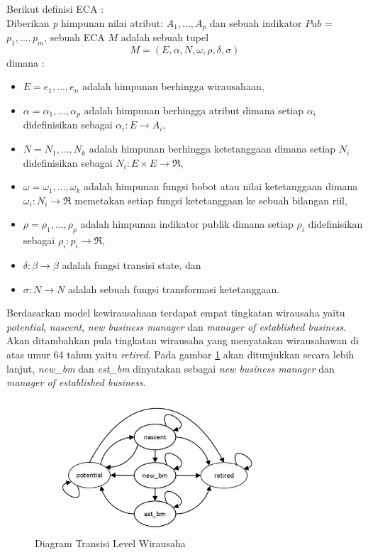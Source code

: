 Berikut definisi ECA :\\
Diberikan \textit{p} himpunan nilai atribut: $A_{1}, ..., A_{p}$ dan sebuah indikator $Pub$ = ${p_{1}, ..., p_{m}}$, sebuah ECA $M$ adalah sebuah tupel
\begin{displaymath}
	M = (E, \alpha, N, \omega, \rho, \delta, \sigma)
\end{displaymath}
dimana :
\begin{itemize}
	\item $E = {e_{1}, ..., e_{n}}$ adalah himpunan berhingga wirausahaan,
	\item $\alpha = {\alpha_{1}, ..., \alpha_{p}}$ adalah himpunan berhingga atribut dimana setiap $\alpha_{i}$ didefinisikan sebagai $\alpha_{i} : E \rightarrow A_{i}$,
	\item $N = {N_{1}, ..., N_{k}}$ adalah himpunan berhingga ketetanggaan dimana setiap $N_{i}$ didefinisikan sebagai $N_{i}:E \times E \rightarrow \Re$,
	\item $\omega = {\omega_{1}, ..., \omega_{k}}$ adalah himpunan fungsi bobot atau nilai ketetanggaan dimana $\omega_{i} : N_{i} \rightarrow \Re$ memetakan setiap fungsi ketetanggaan ke sebuah bilangan riil,
	\item $\rho = {\rho_{1}, ..., \rho_{p}}$ adalah himpunan indikator publik dimana setiap $\rho_{i}$ didefinisikan sebagai $\rho_{i} : p_{i} \rightarrow \Re$,
	\item $\delta : \beta \rightarrow \beta$ adalah fungsi transisi state, dan
	\item $\sigma : N \rightarrow N$ adalah sebuah fungsi transformasi ketetanggaan.
\end{itemize}


Berdasarkan model kewirausahaan terdapat empat tingkatan wirausaha yaitu \textit{potential}, \textit{nascent}, \textit{new business manager} dan \textit{manager of established business}. Akan ditambahkan pula tingkatan wirausaha yang menyatakan wirausahawan di atas umur 64 tahun yaitu \textit{retired}. Pada gambar \ref{fig:tingkatwirausaha} akan ditunjukkan secara lebih lanjut, \textit{new\_bm} dan \textit{est\_bm} dinyatakan sebagai \textit{new business manager} dan \textit{manager of established business}.


	\begin{figure} [H]
		\centering  
		\includegraphics[width=9cm, height=5cm]{tingkatwirausaha} 
		\caption[Diagram Transisi Level Wirausaha]{Diagram Transisi Level Wirausaha} 
		\label{fig:tingkatwirausaha} 
	\end{figure}


